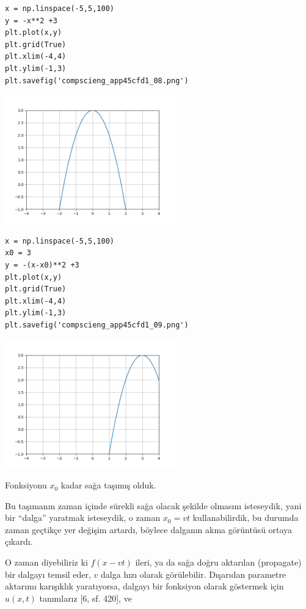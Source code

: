 \documentclass[12pt,fleqn]{article}\usepackage{../../common}
\begin{document}
\begin{verbatim}
x = np.linspace(-5,5,100)
y = -x**2 +3
plt.plot(x,y)
plt.grid(True)
plt.xlim(-4,4)
plt.ylim(-1,3)
plt.savefig('compscieng_app45cfd1_08.png')
\end{verbatim}

\includegraphics[width=20em]{compscieng_app45cfd1_08.png}

\begin{verbatim}
x = np.linspace(-5,5,100)
x0 = 3
y = -(x-x0)**2 +3
plt.plot(x,y)
plt.grid(True)
plt.xlim(-4,4)
plt.ylim(-1,3)
plt.savefig('compscieng_app45cfd1_09.png')
\end{verbatim}

\includegraphics[width=20em]{compscieng_app45cfd1_09.png}

Fonksiyonu $x_0$ kadar sağa taşımış olduk.

Bu taşımanın zaman içinde sürekli sağa olacak şekilde olmasını isteseydik, yani
bir ``dalga'' yaratmak isteseydik, o zaman $x_0 = v t$ kullanabilirdik, bu
durumda zaman geçtikçe yer değişim artardı, böylece dalganın akma görüntüsü
ortaya çıkardı.

O zaman diyebiliriz ki $f(x-vt)$ ileri, ya da sağa doğru aktarılan (propagate)
bir dalgayı temsil eder, $v$ dalga hızı olarak görülebilir. Dışarıdan parametre
aktarımı karışıklık yaratıyorsa, dalgayı bir fonksiyon olarak göstermek için
$u(x,t)$ tanımlarız [6, sf. 420], ve
\end{document}
